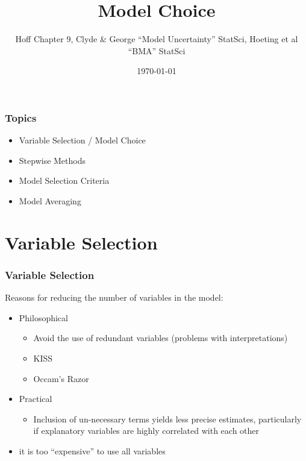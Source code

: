 \documentclass[handout]{beamer}
\title{Model Choice}
\author{Hoff Chapter 9, Clyde \& George ``Model Uncertainty'' StatSci, Hoeting et al ``BMA'' StatSci}
\date{\today}
\begin{document}
\maketitle
\begin{frame}\frametitle{Topics}
  \begin{itemize}
  \item Variable Selection / Model Choice
  \item Stepwise Methods
  \item Model Selection Criteria
  \item Model Averaging
  \end{itemize}
\end{frame}

\section{Variable Selection}
\begin{frame}\frametitle{Variable Selection}
  Reasons for reducing the number of variables in the model: \pause 
  \begin{itemize}
  \item  Philosophical \pause 
  \begin{itemize}
  \item Avoid the use of redundant variables (problems with
    interpretations) \pause 
  \item KISS \pause 
  \item Occam's Razor \pause 
  \end{itemize}
\item Practical  \pause 
  \begin{itemize}
  \item Inclusion of un-necessary terms yields less precise estimates,
    particularly if explanatory variables are highly correlated with
    each other \pause 
  \end{itemize}
\item it is too ``expensive'' to use all variables
  \end{itemize}
\end{frame}
\end{document}
